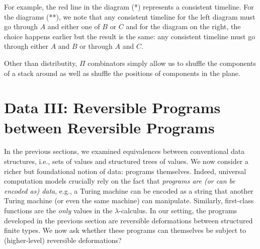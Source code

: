 \documentclass{article}
\newcommand{\amr}[1]{\fbox{Amr says:} \textbf{#1}}
\begin{document}
For example, the red line in the diagram (*) represents a consistent
timeline. For the diagrams (**), we note that any consistent timeline
for the left diagram must go through $A$ and either one of $B$ or $C$
and for the diagram on the right, the choice happens earlier but the
result is the same: any consistent timeline must go through either $A$
and $B$ or through $A$ and $C$.

Other than distributity, $\Pi$ combinators simply allow us to shuffle
the components of a stack around as well as shuffle the positions of
components in the plane. 




\section{Data III: Reversible Programs between Reversible Programs}
\label{sec:pi2}

In the previous sections, we examined equivalences between
conventional data structures, i.e., sets of values and structured trees
of values. We now consider a richer but
foundational notion of data: programs themselves. Indeed, universal
computation models crucially rely on the fact that \emph{programs
are (or can be encoded as) data}, e.g., a Turing machine can be
encoded as a string that another Turing machine (or even the same
machine) can manipulate. Similarly, first-class functions are
the \emph{only} values in the $\lambda$-calculus.
In our setting, the programs developed in the
previous section are reversible deformations between structured finite
types. We now ask whether these programs can themselves
be subject to (higher-level) reversible deformations?
\end{document}
